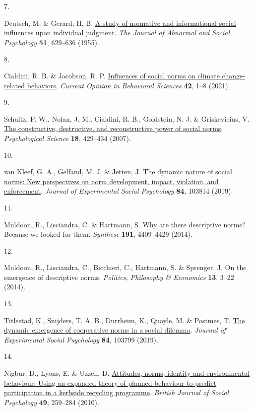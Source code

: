 \documentclass[
  man, donotrepeattitle,floatsintext]{apa6}
\newlength{\cslhangindent}
\newlength{\csllabelwidth}
\newlength{\cslentryspacingunit} %
\newenvironment{CSLReferences}[2] %
 {%
  \setlength{\parindent}{0pt}
  \ifodd #1
  \let\oldpar\par
  \def\par{\hangindent=\cslhangindent\oldpar}
  \fi
  \setlength{\parskip}{#2\cslentryspacingunit}
 }%
 {}
\newcommand{\CSLLeftMargin}[1]{\parbox[t]{\csllabelwidth}{#1}}
\newcommand{\CSLRightInline}[1]{\parbox[t]{\linewidth - \csllabelwidth}{#1}\break}
\begin{document}
\begin{CSLReferences}{0}{0}
\leavevmode{}%
\CSLLeftMargin{7. }%
\CSLRightInline{Deutsch, M. \& Gerard, H. B. \href{https://doi.org/10.1037/h0046408}{A study of normative and informational social influences upon individual judgment}. \emph{The Journal of Abnormal and Social Psychology} \textbf{51}, 629--636 (1955).}

\leavevmode{}%
\CSLLeftMargin{8. }%
\CSLRightInline{Cialdini, R. B. \& Jacobson, R. P. \href{https://doi.org/10.1016/j.cobeha.2021.01.005}{Influences of social norms on climate change-related behaviors}. \emph{Current Opinion in Behavioral Sciences} \textbf{42}, 1--8 (2021).}

\leavevmode{}%
\CSLLeftMargin{9. }%
\CSLRightInline{Schultz, P. W., Nolan, J. M., Cialdini, R. B., Goldstein, N. J. \& Griskevicius, V. \href{https://doi.org/10.1111/j.1467-9280.2007.01917.x}{The constructive, destructive, and reconstructive power of social norms}. \emph{Psychological Science} \textbf{18}, 429--434 (2007).}

\leavevmode{}%
\CSLLeftMargin{10. }%
\CSLRightInline{van Kleef, G. A., Gelfand, M. J. \& Jetten, J. \href{https://doi.org/10.1016/j.jesp.2019.05.002}{The dynamic nature of social norms: New perspectives on norm development, impact, violation, and enforcement}. \emph{Journal of Experimental Social Psychology} \textbf{84}, 103814 (2019).}

\leavevmode{}%
\CSLLeftMargin{11. }%
\CSLRightInline{Muldoon, R., Lisciandra, C. \& Hartmann, S. Why are there descriptive norms? Because we looked for them. \emph{Synthese} \textbf{191}, 4409--4429 (2014).}

\leavevmode{}%
\CSLLeftMargin{12. }%
\CSLRightInline{Muldoon, R., Lisciandra, C., Bicchieri, C., Hartmann, S. \& Sprenger, J. On the emergence of descriptive norms. \emph{Politics, Philosophy \& Economics} \textbf{13}, 3--22 (2014).}

\leavevmode{}%
\CSLLeftMargin{13. }%
\CSLRightInline{Titlestad, K., Snijders, T. A. B., Durrheim, K., Quayle, M. \& Postmes, T. \href{https://doi.org/10.1016/j.jesp.2019.03.010}{The dynamic emergence of cooperative norms in a social dilemma}. \emph{Journal of Experimental Social Psychology} \textbf{84}, 103799 (2019).}

\leavevmode{}%
\CSLLeftMargin{14. }%
\CSLRightInline{Nigbur, D., Lyons, E. \& Uzzell, D. \href{https://doi.org/10.1348/014466609X449395}{Attitudes, norms, identity and environmental behaviour: Using an expanded theory of planned behaviour to predict participation in a kerbside recycling programme}. \emph{British Journal of Social Psychology} \textbf{49}, 259--284 (2010).}


\end{CSLReferences}
\end{document}
